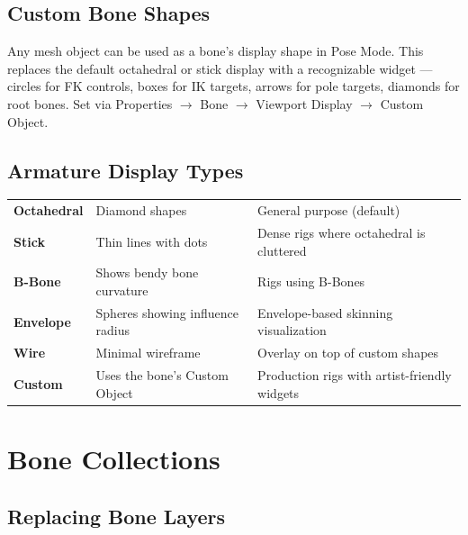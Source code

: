 \subsection{Custom Bone Shapes}
\label{subsec:custom-shapes}

Any mesh object can be used as a bone's display shape in Pose Mode. This replaces the default octahedral or stick display with a recognizable widget --- circles for FK controls, boxes for IK targets, arrows for pole targets, diamonds for root bones. Set via Properties $\rightarrow$ Bone $\rightarrow$ Viewport Display $\rightarrow$ Custom Object.

\subsection{Armature Display Types}
\label{subsec:armature-display}

\begin{center}
\begin{tabularx}{\textwidth}{L{2.5cm}L{4cm}X}
\toprule
{}
 &  &  \\
\midrule
\textbf{Octahedral} & Diamond shapes & General purpose (default) \\
\textbf{Stick} & Thin lines with dots & Dense rigs where octahedral is cluttered \\
\textbf{B-Bone} & Shows bendy bone curvature & Rigs using B-Bones \\
\textbf{Envelope} & Spheres showing influence radius & Envelope-based skinning visualization \\
\textbf{Wire} & Minimal wireframe & Overlay on top of custom shapes \\
\textbf{Custom} & Uses the bone's Custom Object & Production rigs with artist-friendly widgets \\
\bottomrule
\end{tabularx}
\end{center}


\section{Bone Collections}
\label{sec:bone-collections}

\subsection{Replacing Bone Layers}

